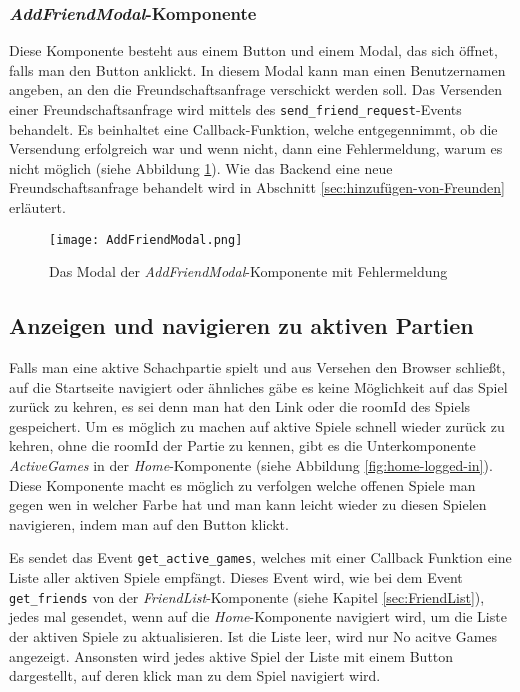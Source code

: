 \subsubsection{\textit{AddFriendModal}-Komponente}
Diese Komponente besteht aus einem Button und einem Modal, das sich öffnet, falls man den Button anklickt. In diesem Modal kann man einen Benutzernamen angeben, an den die Freundschaftsanfrage verschickt werden soll. Das Versenden einer Freundschaftsanfrage wird mittels des \verb|send_friend_request|-Events behandelt. Es beinhaltet eine Callback-Funktion, welche entgegennimmt, ob die Versendung erfolgreich war und wenn nicht, dann eine Fehlermeldung, warum es nicht möglich (siehe Abbildung \ref{fig:AddFriendModal}). Wie das Backend eine neue Freundschaftsanfrage behandelt wird in Abschnitt \ref{sec:hinzufügen-von-Freunden} erläutert.

\begin{figure}[h]
\centering
\texttt{[image: AddFriendModal.png]}
\caption{Das Modal der \textit{AddFriendModal}-Komponente mit Fehlermeldung}
\label{fig:AddFriendModal}
\end{figure}

\subsection{Anzeigen und navigieren zu aktiven Partien}
Falls man eine aktive Schachpartie spielt und aus Versehen den Browser schließt, auf die Startseite navigiert oder ähnliches gäbe es keine Möglichkeit auf das Spiel zurück zu kehren, es sei denn man hat den Link oder die roomId des Spiels gespeichert. Um es möglich zu machen auf aktive Spiele schnell wieder zurück zu kehren, ohne die roomId der Partie zu kennen, gibt es die Unterkomponente \textit{ActiveGames} in der \textit{Home}-Komponente (siehe Abbildung \ref{fig:home-logged-in}). Diese Komponente macht es möglich zu verfolgen welche offenen Spiele man gegen wen in welcher Farbe hat und man kann leicht wieder zu diesen Spielen navigieren, indem man auf den Button klickt.

Es sendet das Event \verb|get_active_games|, welches mit einer Callback Funktion  eine Liste aller aktiven Spiele empfängt. Dieses Event wird, wie bei dem Event \verb|get_friends| von der \textit{FriendList}-Komponente (siehe Kapitel \ref{sec:FriendList}), jedes mal gesendet, wenn auf die \textit{Home}-Komponente navigiert wird, um die Liste der aktiven Spiele zu aktualisieren.
Ist die Liste leer, wird nur \glqq No acitve Games\grqq{ } angezeigt. Ansonsten wird jedes aktive Spiel der Liste mit einem Button dargestellt, auf deren klick man zu dem Spiel navigiert wird.

